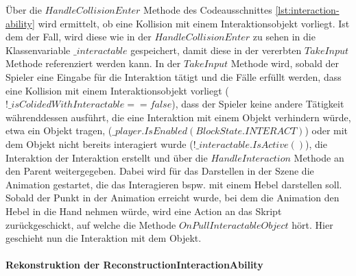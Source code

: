 Über die $HandleCollisionEnter$ Methode des Codeausschnittes \ref{lst:interaction-ability} wird ermittelt, ob eine Kollision mit einem Interaktionsobjekt vorliegt. Ist dem der Fall, wird diese wie in der $HandleCollisionEnter$ zu sehen in die Klassenvariable $\_interactable$ gespeichert, damit diese in der vererbten $TakeInput$ Methode referenziert werden kann. In der $TakeInput$ Methode wird, sobald der Spieler eine Eingabe für die Interaktion tätigt und die Fälle erfüllt werden, dass eine Kollision mit einem Interaktionsobjekt vorliegt ($!\_isColidedWithInteractable == false$), dass der Spieler keine andere Tätigkeit währenddessen ausführt, die eine Interaktion mit einem Objekt verhindern würde, etwa ein Objekt tragen, ($\_player.IsEnabled(BlockState.INTERACT)$) oder mit dem Objekt nicht bereits interagiert wurde ($!\_interactable.IsActive()$), die Interaktion der Interaktion erstellt und über die $HandleInteraction$ Methode an den Parent weitergegeben. Dabei wird für das Darstellen in der Szene die Animation gestartet, die das Interagieren bspw. mit einem Hebel darstellen soll. Sobald der Punkt in der Animation erreicht wurde, bei dem die Animation den Hebel in die Hand nehmen würde, wird eine Action an das Skript zurückgeschickt, auf welche die  Methode $OnPullInteractableObject$ hört. Hier geschieht nun die Interaktion mit dem Objekt.

\paragraph{Rekonstruktion der ReconstructionInteractionAbility}
~

